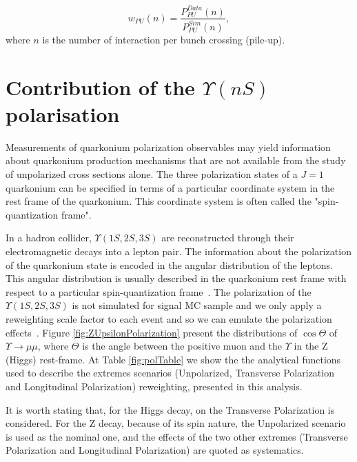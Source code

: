\begin{equation}
\label{eqn:mc_weight}
w_{PU}(n) = \frac{P^{Data}_{PU}(n)}{P^{Sim}_{PU}(n)},
\end{equation}
where $n$ is the number of interaction per bunch crossing (pile-up).

\section{Contribution of the \texorpdfstring{$\Upsilon(nS)$} p polarisation}
\label{sec:polarization}

Measurements of quarkonium polarization observables may yield information about quarkonium production mechanisms that are not available from the study of unpolarized cross sections alone. The three polarization states of a $J = 1$ quarkonium can be specified in terms of a particular coordinate system in the rest frame of the quarkonium. This coordinate system is often called the "spin-quantization frame". 

In a hadron collider, $\Upsilon(1S,2S,3S)$ are reconstructed through their electromagnetic decays into a lepton pair. The information about the polarization of the quarkonium state is encoded in the angular distribution of the leptons. This angular distribution is usually described in the quarkonium rest frame with respect to a particular spin-quantization frame~\cite{Brambilla:2011bph}. The polarization of the  $\Upsilon(1S,2S,3S)$ is not simulated for signal MC sample and we only apply a reweighting scale factor to each event and so we can emulate the polarization effects~\cite{PhysRevD.83.031503}. Figure \ref{fig:ZUpsilonPolarization} present the distributions of $\cos \Theta$ of $\Upsilon \rightarrow \mu\mu$, 
where $\Theta$ is the angle between the positive muon and the $\Upsilon$ in the Z (Higgs) rest-frame. At Table \ref{fig:polTable} we show the the analytical functions used to describe the extremes scenarios (Unpolarized, Transverse Polarization and Longitudinal Polarization) reweighting, presented in this analysis. 

It is worth stating that, for the Higgs decay, on the Transverse Polarization is considered. For the Z decay, because of its spin nature, the Unpolarized scenario is used as the nominal one, and the effects of the two other extremes (Transverse Polarization and Longitudinal Polarization) are quoted as systematics.




